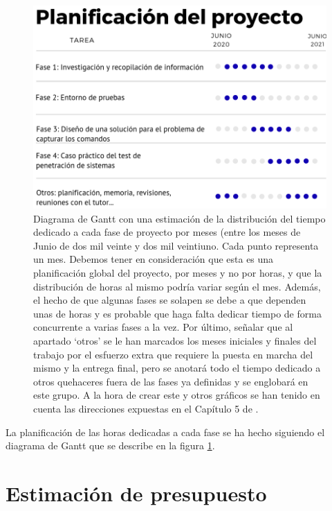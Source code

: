 \begin{figure}[!hbt]
  \centering
  \includegraphics[width=\textwidth]{imagenes/gantt.png}
  \caption{Diagrama de Gantt con una estimación de la distribución del tiempo dedicado a cada fase de proyecto por meses (entre los meses de Junio de dos mil veinte y dos mil veintiuno. Cada punto representa un mes. Debemos tener en consideración que esta es una planificación global del proyecto, por meses y no por horas, y que la distribución de horas al mismo podría variar según el mes. Además, el hecho de que algunas fases se solapen se debe a que dependen unas de horas y es probable que haga falta dedicar tiempo de forma concurrente a varias fases a la vez. Por último, señalar que al apartado `otros' se le han marcados los meses iniciales y finales del trabajo por el esfuerzo extra que requiere la puesta en marcha del mismo y la entrega final, pero se anotará todo el tiempo dedicado a otros quehaceres fuera de las fases ya definidas y se englobará en este grupo. A la hora de crear este y otros gráficos se han tenido en cuenta las direcciones expuestas en el Capítulo 5 de  \cite{books/daglib/0076234}.}
  \label{gantt}
\end{figure}

La planificación de las horas dedicadas a cada fase se ha hecho siguiendo el diagrama de Gantt que se describe en la figura \ref{gantt}.








\section{Estimación de presupuesto}

